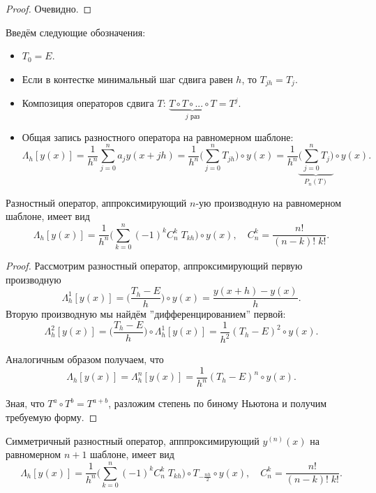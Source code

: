 \documentclass[../main.tex]{subfile}
\begin{document}
\begin{proof}
	Очевидно.
\end{proof}

\begin{define}
	Введём следующие обозначения:
	\begin{itemize}[nosep]
		\item $T_0=E$.
		\item Если в контестке минимальный шаг сдвига равен $h$, то
			$T_{jh}=T_j$.
		\item Композиция операторов сдвига $T$: $\underset{j\text{ раз}}
			{\underbrace{T\circ T\circ...\circ T}}=T^j$.
		\item Общая запись разностного оператора на равномерном шаблоне:
			\[\Lambda_h[y(x)]=\frac{1}{h^n}\sum_{j=0}^{n}a_jy(x+jh)=
			\frac{1}{h^n}\Big(\sum_{j=0}^{n}T_{jh}\Big)\circ y(x)=
			\frac{1}{h^n}\underset{P_n(T)}{\underbrace{\Big(
			\sum_{j=0}^{n}T_j\Big)}}\circ y(x).\]
	\end{itemize}
\end{define}

\begin{theorem}
	Разностный оператор, аппроксимирующий $n$-ую производную на равномерном
	шаблоне, имеет вид
	\[\boxed{\Lambda_h[y(x)]=\frac{1}{h^n}\Big(\sum_{k=0}^{n}(-1)^kC_n^k\;
	T_{kh}\Big)\circ y(x)},\quad C_n^k=\frac{n!}{(n-k)!\;k!}.\]
\end{theorem}

\begin{proof}
	Рассмотрим разностный оператор, аппроксимирующий первую производную
	\[\Lambda_h^1[y(x)]=\Big(\frac{T_h-E}{h}\Big)\circ y(x)=\frac{y(x+h)-
	y(x)}{h}.\]
	Вторую производную мы найдём ''дифференцированием'' первой:
	\[\Lambda_h^2[y(x)]=\Big(\frac{T_h-E}{h}\Big)\circ\Lambda_h^1[y(x)]=
	\frac{1}{h^2}(T_h-E)^2\circ y(x).\]

	Аналогичным образом получаем, что
	\[\Lambda_h[y(x)]=\Lambda_h^n[y(x)]=\frac{1}{h^n}(T_h-E)^n\circ y(x).\]

	Зная, что $T^a\circ T^b=T^{a+b}$, разложим степень по биному Ньютона
	и получим требуемую форму.
\end{proof}

\begin{corollary}
	Симметричный разностный оператор, апппроксимирующий $y^{(n)}(x)$ на 
	равномерном $n+1$ шаблоне, имеет вид
	\[\boxed{\Lambda_h[y(x)]=\frac{1}{h^n}\Big(\sum_{k=0}^{n}(-1)^kC_n^k\;
	T_{kh}\Big)\circ T_{-\frac{nh}{2}}\circ y(x)},\quad C_n^k=\frac{n!}
	{(n-k)!\;k!}.\]
\end{corollary}
\end{document}

